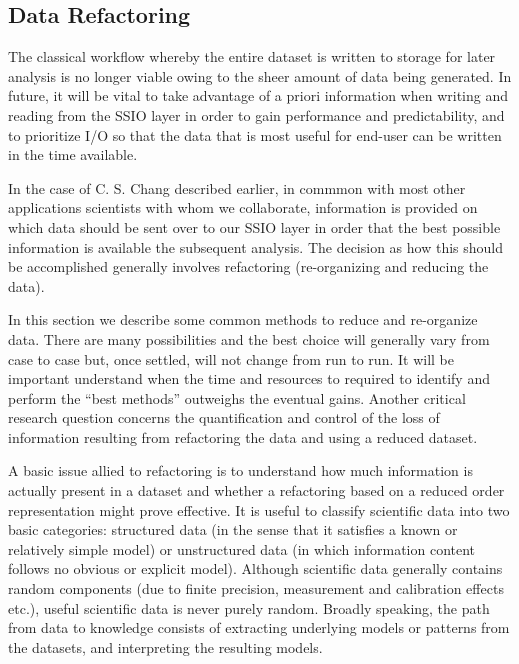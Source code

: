 \subsection{Data Refactoring} \label{sec:data-refactor} 

The classical workflow whereby the entire dataset is written to storage for
later analysis is no longer viable owing to the sheer amount of data being
generated. In future, it will be vital to take advantage of a priori
information when writing and reading from the SSIO layer in order to gain
performance and predictability, and to prioritize I/O so that the data that
is most useful for end-user can be written in the time available. 

In the case of C. S. Chang described earlier, in commmon with most other
applications scientists with whom we collaborate, information is provided on
which data should be sent over to our SSIO layer in order that the best
possible information is available the subsequent analysis. The decision as how
this should be accomplished generally involves refactoring (re-organizing and
reducing the data). 

In this section we describe some common methods to reduce and re-organize data.
There are many possibilities and the best choice will generally vary from case
to case but, once settled, will not change from run to run. It will be
important understand when the time and resources to required to identify and
perform the ``best methods'' outweighs the eventual gains. Another critical
research question concerns the quantification and control of the loss of
information resulting from refactoring the data and using a reduced 
dataset. 

A basic issue allied to refactoring is to understand how much information is
actually present in a dataset and whether a refactoring based on a reduced
order representation might prove effective. It is useful to classify scientific
data into two basic categories: structured data (in the sense that it satisfies
a known or relatively simple model) or unstructured data (in which information
content follows no obvious or explicit model).  Although scientific data
generally contains random components (due to finite precision, measurement and
calibration effects etc.), useful scientific data is never purely random.
Broadly speaking, the path from data to knowledge consists of extracting
underlying models or patterns from the datasets, and interpreting the resulting
models. 

